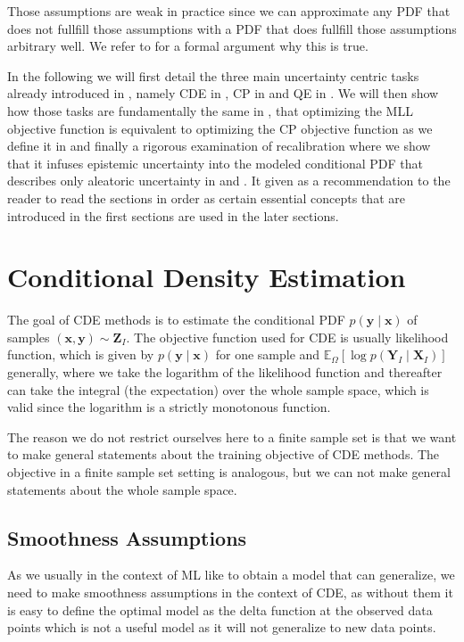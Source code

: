 Those assumptions are weak in practice since we can approximate any PDF that does not fullfill those assumptions with a PDF that does fullfill those assumptions arbitrary well. We refer to \cite{klenke2013probability} for a formal argument why this is true.

In the following we will first detail the three main uncertainty centric tasks already introduced in , namely CDE in , CP in  and QE in . We will then show how those tasks are fundamentally the same in , that optimizing the MLL objective function is equivalent to optimizing the CP objective function as we define it in  and finally a rigorous examination of recalibration where we show that it infuses epistemic uncertainty into the modeled conditional PDF that describes only aleatoric uncertainty in  and . It given as a recommendation to the reader to read the sections in order as certain essential concepts that are introduced in the first sections are used in the later sections.

\section{Conditional Density Estimation}\label{sec:cde}

The goal of CDE methods is to estimate the conditional PDF $p(\mathbf{y}\mid \mathbf{x})$ of samples $(\mathbf{x}, \mathbf{y}) \sim \mathbf{Z}_I$. The objective function used for CDE is usually likelihood function, which is given by $p(\mathbf{y}\mid \mathbf{x})$ for one sample and $\mathbb{E}_{\Omega}\left[\log p(\mathbf{Y}_I \mid \mathbf{X}_I)\right]$ generally, where we take the logarithm of the likelihood function and thereafter can take the integral (the expectation) over the whole sample space, which is valid since the logarithm is a strictly monotonous function.

The reason we do not restrict ourselves here to a finite sample set is that we want to make general statements about the training objective of CDE methods. The objective in a finite sample set setting is analogous, but we can not make general statements about the whole sample space. %

\subsection{Smoothness Assumptions}\label{sec:smoothness}
As we usually in the context of ML like to obtain a model that can generalize, we need to make smoothness assumptions in the context of CDE, as without them it is easy to define the optimal model as the delta function at the observed data points which is not a useful model as it will not generalize to new data points.

